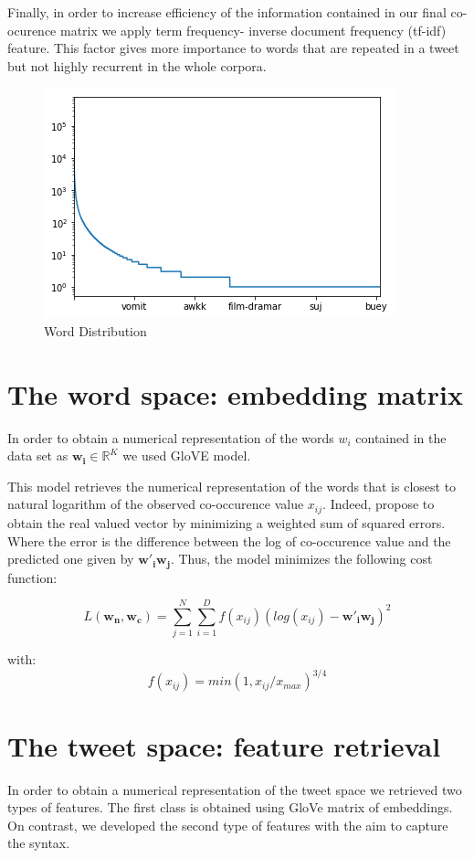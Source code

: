 \documentclass[10pt,conference,compsocconf]{IEEEtran}
\begin{document}
Finally, in order to increase efficiency of the information contained in our final co-ocurence matrix we apply term frequency- inverse document frequency (tf-idf) feature. This factor gives more importance to words that are repeated in a tweet but not highly recurrent in the whole corpora.  

\begin{tiny}
		\begin{figure}[b] \label{fig1}
			\includegraphics[scale=0.5]{WordDistribution.png}   
			\caption{Word Distribution }
			\label{fig1}    
		\end{figure}
\end{tiny}

\section{The word space: embedding matrix }
\label{S1}
In order to obtain a numerical representation of the words $w_i$ contained in the data set  as $\textbf{w}_{\textbf{i}} \in \mathbb{R}^K$ we used GloVE model. 

This model retrieves the numerical representation of the words that is closest to natural logarithm of the observed co-occurence value $x_{ij}$. Indeed,  \cite{pennington2014glove} propose to obtain the real valued vector by minimizing a weighted sum of squared errors. Where the error is the difference between the log of co-occurence value and the predicted one given by $\textbf{w}'_{\textbf{i}}\textbf{w}_{\textbf{j}}$. Thus, the model minimizes the following cost function: 

$$L(\textbf{w}_{\textbf{n}},\textbf{w}_{\textbf{c}})=\sum_{j=1}^{N}\sum_{i=1}^{D}f(x_{ij})(log(x_{ij})-\textbf{w}'_{\textbf{i}}\textbf{w}_{\textbf{j}})^2$$ 

with: 
$$f(x_{ij})=min(1,x_{ij}/x_{max})^{3/4}$$ 
\section{The tweet space: feature retrieval}
In order to obtain a numerical representation of the tweet space we retrieved two types of features. The first class is obtained using GloVe matrix of embeddings. On contrast, we developed the second type of features with the aim to capture the syntax.
\end{document}
